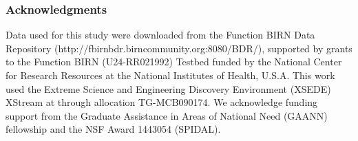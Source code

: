 \documentclass{article}
\begin{document}
\subsubsection*{Acknowledgments}

Data used for this study were downloaded from the Function BIRN Data Repository (http://fbirnbdr.birncommunity.org:8080/BDR/), supported by grants to the Function BIRN (U24-RR021992) Testbed funded by the National Center for Research Resources at the National Institutes of Health, U.S.A. This work used the Extreme Science and Engineering Discovery Environment (XSEDE) XStream at through allocation TG-MCB090174. We acknowledge funding support from the Graduate Assistance in Areas of National Need (GAANN) fellowship and the NSF Award 1443054 (SPIDAL). 



\end{document}
